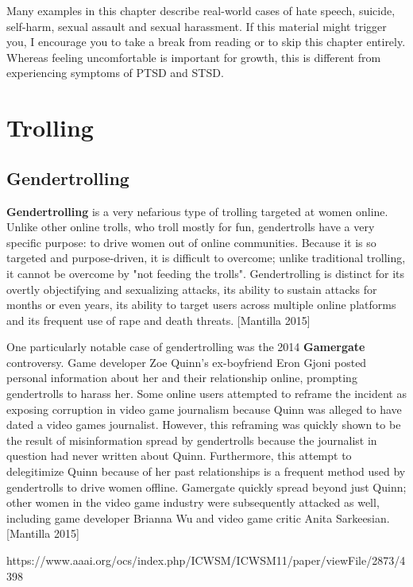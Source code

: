 \documentclass[class=book, crop=false]{standalone}
\providecommand{\keyterm}[1]{\textbf{#1}\marginnote{\scriptsize \textbf{#1}}}
\begin{document}
Many examples in this chapter describe real-world cases of hate speech, suicide, self-harm, sexual assault and sexual harassment. If this material might trigger you, I encourage you to take a break from reading or to skip this chapter entirely. Whereas feeling uncomfortable is important for growth, this is different from experiencing symptoms of PTSD and STSD.

\section{Trolling}

\subsection{Gendertrolling}

\keyterm{Gendertrolling} is a very nefarious type of trolling targeted at women online. Unlike other online trolls, who troll mostly for fun, gendertrolls have a very specific purpose: to drive women out of online communities. Because it is so targeted and purpose-driven, it is difficult to overcome; unlike traditional trolling, it cannot be overcome by "not feeding the trolls". Gendertrolling is distinct for its overtly objectifying and sexualizing attacks, its ability to sustain attacks for months or even years, its ability to target users across multiple online platforms and its frequent use of rape and death threats. [Mantilla 2015]

One particularly notable case of gendertrolling was the 2014 \keyterm{Gamergate} controversy. Game developer Zoe Quinn's ex-boyfriend Eron Gjoni posted personal information about her and their relationship online, prompting gendertrolls to harass her. Some online users attempted to reframe the incident as exposing corruption in video game journalism because Quinn was alleged to have dated a video games journalist. However, this reframing was quickly shown to be the result of misinformation spread by gendertrolls because the journalist in question had never written about Quinn. Furthermore, this attempt to delegitimize Quinn because of her past relationships is a frequent method used by gendertrolls to drive women offline. Gamergate quickly spread beyond just Quinn; other women in the video game industry were subsequently attacked as well, including game developer Brianna Wu and video game critic Anita Sarkeesian. [Mantilla 2015]

https://www.aaai.org/ocs/index.php/ICWSM/ICWSM11/paper/viewFile/2873/4398\\
\end{document}
